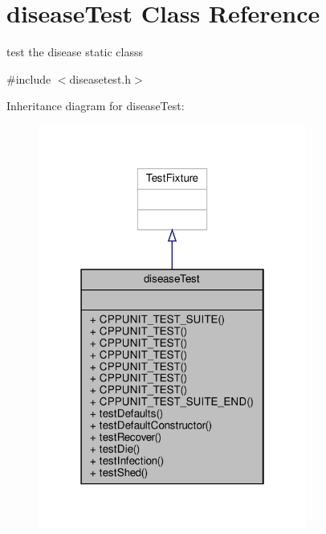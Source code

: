 \hypertarget{classdiseaseTest}{}\section{disease\+Test Class Reference}
\label{classdiseaseTest}


test the disease static classs  




{\ttfamily \#include $<$diseasetest.\+h$>$}



Inheritance diagram for disease\+Test\+:\nopagebreak
\begin{figure}[H]
\begin{center}
\leavevmode
\includegraphics[width=250pt]{classdiseaseTest__inherit__graph}
\end{center}
\end{figure}


